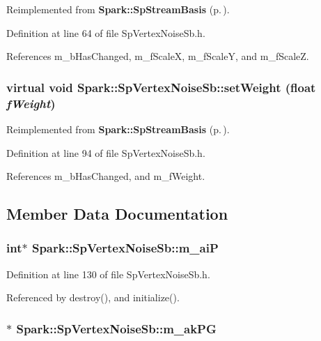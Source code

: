 Reimplemented from {\bf Spark::Sp\-Stream\-Basis} {\rm (p.\,\pageref{classSpark_1_1SpStreamBasis_a8})}.

Definition at line 64 of file Sp\-Vertex\-Noise\-Sb.h.

References m\_\-b\-Has\-Changed, m\_\-f\-Scale\-X, m\_\-f\-Scale\-Y, and m\_\-f\-Scale\-Z.
\subsubsection{\setlength{\rightskip}{0pt plus 5cm}virtual void Spark::Sp\-Vertex\-Noise\-Sb::set\-Weight (float {\em f\-Weight})\hspace{0.3cm}{\tt  [inline, virtual]}}\label{classSpark_1_1SpVertexNoiseSb_a11}




Reimplemented from {\bf Spark::Sp\-Stream\-Basis} {\rm (p.\,\pageref{classSpark_1_1SpStreamBasis_a4})}.

Definition at line 94 of file Sp\-Vertex\-Noise\-Sb.h.

References m\_\-b\-Has\-Changed, and m\_\-f\-Weight.

\subsection{Member Data Documentation}
\subsubsection{\setlength{\rightskip}{0pt plus 5cm}int$\ast$ {\bf Spark::Sp\-Vertex\-Noise\-Sb::m\_\-ai\-P}\hspace{0.3cm}{\tt  [protected]}}\label{classSpark_1_1SpVertexNoiseSb_p2}


Definition at line 130 of file Sp\-Vertex\-Noise\-Sb.h.

Referenced by destroy(), and initialize().
\subsubsection{$\ast$ {\bf Spark::Sp\-Vertex\-Noise\-Sb::m\_\-ak\-PG}\hspace{0.3cm}{\tt  [protected]}}\label{classSpark_1_1SpVertexNoiseSb_p3}


